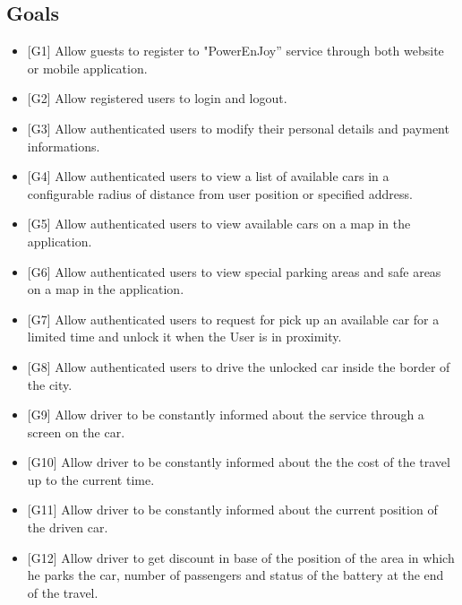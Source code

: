 \subsection{Goals}
\begin{itemize}
	\item {[}G1{]} Allow guests to register to "PowerEnJoy'' service through
	both website or mobile application.
	\item {[}G2{]} Allow registered users to login and logout.
	\item {[}G3{]} Allow authenticated users to modify their personal details
	and payment informations.
	\item {[}G4{]} Allow authenticated users to view a list of available cars
	in a configurable radius of distance from user position or specified
	address.
	
	
	\item {[}G5{]} Allow authenticated users to view available cars on a map in the application.
	\item {[}G6{]} Allow authenticated users to view special parking areas and safe areas on a map in the application.
	
	\item {[}G7{]} Allow authenticated users to request for pick up an available
	car for a limited time and unlock it when the User is in proximity.
	
	\item {[}G8{]} Allow authenticated users to drive the unlocked car inside
	the border of the city.
	
	\item {[}G9{]} Allow driver to be constantly informed about the service through a screen on the car.
	\item {[}G10{]} Allow driver to be constantly informed about the the cost of the travel up to the current time.
	\item {[}G11{]} Allow driver to be constantly informed about the current position of the driven car.
	\item {[}G12{]} Allow driver to get discount in base of the position of the area in which he parks the car, 
	number of passengers and status of the battery at the end of the travel.
	

\end{itemize}
